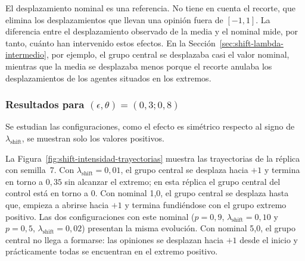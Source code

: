 \documentclass[11pt,a4paper]{article}
\begin{document}
El desplazamiento nominal es una referencia. No tiene en cuenta el recorte, que elimina los desplazamientos que llevan una opinión fuera de $[-1,1]$. La diferencia entre el desplazamiento observado de la media y el nominal mide, por tanto, cuánto han intervenido estos efectos. En la Sección~\ref{sec:shift-lambda-intermedio}, por ejemplo, el grupo central se desplazaba casi el valor nominal, mientras que la media se desplazaba menos porque el recorte anulaba los desplazamientos de los agentes situados en los extremos.

\subsubsection{Resultados para $(\epsilon,\theta)=(0{,}3;0{,}8)$}
\label{sec:shift-intensidad-03-08}

Se estudian las configuraciones, como el efecto es simétrico respecto al signo de $\lambda_{\mathrm{shift}}$, se muestran solo los valores positivos.

La Figura~\ref{fig:shift-intensidad-trayectorias} muestra las trayectorias de la réplica con semilla~7. Con $\lambda_{\mathrm{shift}}=0{,}01$, el grupo central se desplaza hacia $+1$ y termina en torno a $0{,}35$ sin alcanzar el extremo; en esta réplica el grupo central del control está en torno a $0$. Con nominal 1,0, el grupo central se desplaza hasta que, empieza a abrirse hacia $+1$ y termina fundiéndose con el grupo extremo positivo. Las dos configuraciones con este nominal ($p=0{,}9$, $\lambda_{\mathrm{shift}}=0{,}10$ y $p=0{,}5$, $\lambda_{\mathrm{shift}}=0{,}02$) presentan la misma evolución. Con nominal 5,0, el grupo central no llega a formarse: las opiniones se desplazan hacia $+1$ desde el inicio y prácticamente todas se encuentran en el extremo positivo.
\end{document}
